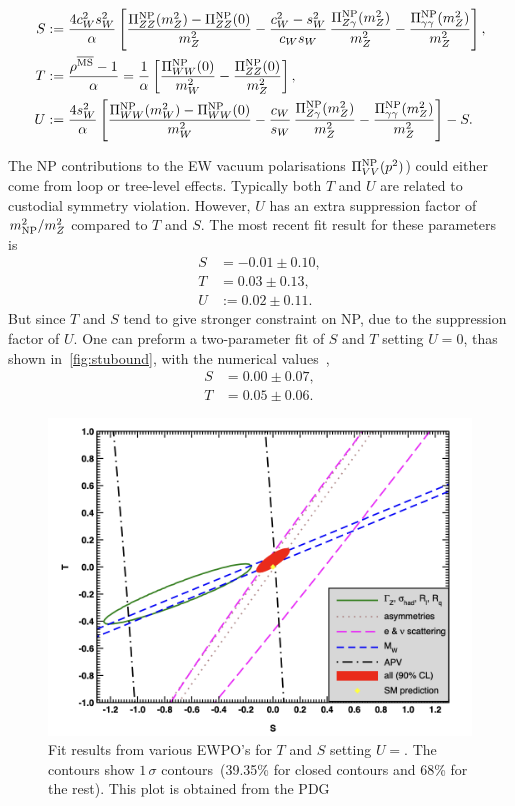  \begin{tcolorbox}[title=The oblique parameters,
	title filled=false,
	colback=Mahogany!5!white,
	colframe=Mahogany]
\begin{align}
	S &:=\frac{4 c_W^2 s_W^2}{\alpha} \left[ \frac{\Pi_{ZZ}^{\mathrm{NP}} (m_Z^2)- \Pi_{ZZ}^{\mathrm{NP}} (0)}{m_Z^2}  - \frac{c_W^2-s_W^2}{c_Ws_W}\,\frac{\Pi_{Z\gamma}^{\mathrm{NP}}(m_Z^2)}{m_Z^2}-\frac{\Pi_{\gamma\gamma}^{\mathrm{NP}}(m_Z^2)}{m_Z^2}\right],  \nonumber \\
	T &:=\frac{\rho^{\overline{\mathrm{MS}}}-1}{\alpha}  = \frac{1}{\alpha} \left[ \frac{\Pi^{\mathrm{NP}}_{WW}(0)}{m_W^2}- \frac{\Pi^{\mathrm{NP}}_{ZZ}(0)}{m_Z^2} \right] , \\
	U&:= \frac{4 s_W^2}{\alpha} \left[ \frac{\Pi_{WW}^{\mathrm{NP}} (m_W^2)- \Pi_{WW}^{\mathrm{NP}} (0)}{m_W^2}   - \frac{c_W}{s_W}\,\frac{\Pi_{Z\gamma}^{\mathrm{NP}}(m_Z^2)}{m_Z^2}-\frac{\Pi_{\gamma\gamma}^{\mathrm{NP}}(m_Z^2)}{m_Z^2}\right] -S .\nonumber 
\end{align}
\end{tcolorbox}
The NP contributions to the EW vacuum polarisations $\Pi_{VV}^{\mathrm{NP}}(p^2)$) could either come from loop or tree-level effects. Typically both $T$ and $U$ are related to custodial symmetry violation. However, $U$ has an extra suppression factor of $m_{\mathrm{NP}}^2/m_Z^2$ compared to $T$ and $S$. The most recent fit result for these parameters is~\cite{Zyla:2020zbs}
\begin{align}
	S &=-0.01\pm0.10,  \nonumber \\
	T &= 0.03\pm0.13, \\
	U&:= 0.02\pm0.11.\nonumber 
\end{align}
But since $T$ and $S$ tend to give stronger constraint on NP, due to the suppression factor of $U$. One can preform a two-parameter fit of $S$ and $T$ setting $U=0$, thas shown in~\autoref{fig:stubound}, with the numerical values~\cite{Zyla:2020zbs}, \\
 \begin{align}
 	S &=0.00\pm0.07,  \nonumber \\
 	T &= 0.05\pm0.06.
 \end{align}
\begin{figure}[t]
	\centering
	\includegraphics[width=0.65\linewidth]{./figures/stu-pdg}
	\caption{ Fit results from various EWPO's for $T$ and $S$ setting $U=$. The contours show $1\,\sigma$ contours~(39.35\% for closed contours and 68\% for the rest). This plot is obtained from the PDG~\cite{Zyla:2020zbs}  }  \label{fig:stubound}
\end{figure}
